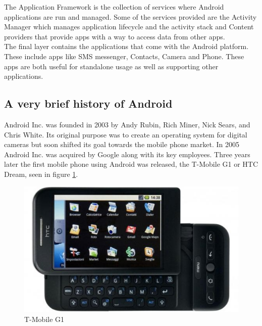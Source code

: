 The Application Framework is the collection of services where Android applications are run and managed. Some of the services provided are the Activity Manager which manages application lifecycle and the activity stack and Content providers that provide apps with a way to access data from other apps.\\

The final layer contains the applications that come with the Android platform. These include apps like SMS messenger, Contacts, Camera and Phone. These apps are both useful for standalone usage as well as supporting other applications.

\subsection{A very brief history of Android}

\begin{minipage}{0.33\textwidth}
Android Inc. was founded in 2003 by Andy Rubin, Rich Miner, Nick Sears, and Chris White. Its original purpose was to create an operating system for digital cameras but soon shifted its goal towards the mobile phone market. In 2005 Android Inc. was acquired by Google along with its key employees. Three years later the first mobile phone using Android was released, the T-Mobile G1 or HTC Dream, seen in figure \ref{fig:htc}.
\end{minipage}
\hfill
\begin{minipage}{0.60\textwidth}
\begin{figure}[H]
\centering
\includegraphics[scale=.75]{htc_dream.jpg}
\caption{T-Mobile G1}
\label{fig:htc}
\end{figure}
\end{minipage}
\\

